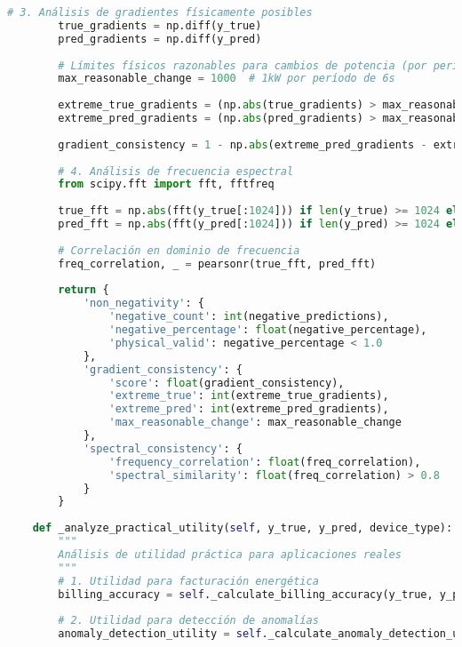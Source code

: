 \begin{lstlisting}[language=Python, caption=Framework integral de evaluación]
        # 3. Análisis de gradientes físicamente posibles
        true_gradients = np.diff(y_true)
        pred_gradients = np.diff(y_pred)
        
        # Límites físicos razonables para cambios de potencia (por período de 6s)
        max_reasonable_change = 1000  # 1kW por período de 6s
        
        extreme_true_gradients = (np.abs(true_gradients) > max_reasonable_change).sum()
        extreme_pred_gradients = (np.abs(pred_gradients) > max_reasonable_change).sum()
        
        gradient_consistency = 1 - np.abs(extreme_pred_gradients - extreme_true_gradients) / len(true_gradients)
        
        # 4. Análisis de frecuencia espectral
        from scipy.fft import fft, fftfreq
        
        true_fft = np.abs(fft(y_true[:1024])) if len(y_true) >= 1024 else np.abs(fft(y_true))
        pred_fft = np.abs(fft(y_pred[:1024])) if len(y_pred) >= 1024 else np.abs(fft(y_pred))
        
        # Correlación en dominio de frecuencia
        freq_correlation, _ = pearsonr(true_fft, pred_fft)
        
        return {
            'non_negativity': {
                'negative_count': int(negative_predictions),
                'negative_percentage': float(negative_percentage),
                'physical_valid': negative_percentage < 1.0
            },
            'gradient_consistency': {
                'score': float(gradient_consistency),
                'extreme_true': int(extreme_true_gradients),
                'extreme_pred': int(extreme_pred_gradients),
                'max_reasonable_change': max_reasonable_change
            },
            'spectral_consistency': {
                'frequency_correlation': float(freq_correlation),
                'spectral_similarity': float(freq_correlation) > 0.8
            }
        }
    
    def _analyze_practical_utility(self, y_true, y_pred, device_type):
        """
        Análisis de utilidad práctica para aplicaciones reales
        """
        # 1. Utilidad para facturación energética
        billing_accuracy = self._calculate_billing_accuracy(y_true, y_pred)
        
        # 2. Utilidad para detección de anomalías
        anomaly_detection_utility = self._calculate_anomaly_detection_utility(y_true, y_pred)
        

\end{lstlisting}
